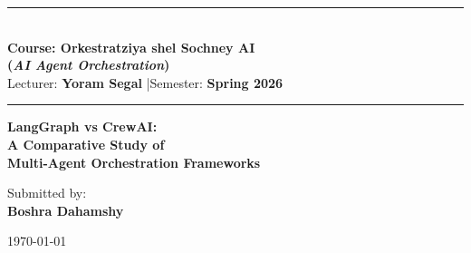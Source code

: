 \documentclass[12pt,a4paper]{article}
\begin{document}
\begin{titlepage}
    \begin{center}
        \vspace*{1.5cm}
        \rule{\textwidth}{1.5pt}\\[0.6em]
        {\large\bfseries
            Course: Orkestratziya shel Sochney AI\\[0.2em]
            {\normalfont\normalsize
                (\textit{AI Agent Orchestration})}
        }\\[0.4em]
        {\normalsize Lecturer: \textbf{Yoram Segal}
                     \quad|\quad Semester: \textbf{Spring 2026}}\\[0.2em]
        \rule{\textwidth}{1.5pt}

        \vspace{3cm}

        {\LARGE\bfseries
            LangGraph vs CrewAI:\\[0.4em]
            A Comparative Study of\\[0.4em]
            Multi-Agent Orchestration Frameworks
        }

        \vspace{3cm}
        {\large Submitted by:}\\[0.5em]
        {\Large\bfseries Boshra Dahamshy}

        \vfill
        {\normalsize \today}
    \end{center}
\end{titlepage}

\thispagestyle{empty}
\tableofcontents
\newpage
\setcounter{page}{1}
\end{document}
